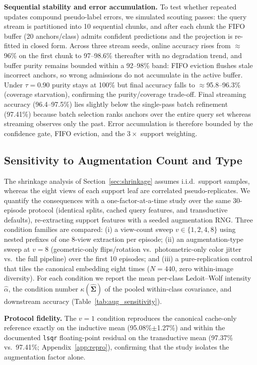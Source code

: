 \documentclass[preprint,12pt]{elsarticle}
\begin{document}
\textbf{Sequential stability and error accumulation.} To test whether repeated updates compound pseudo-label errors, we simulated scouting passes: the query stream is partitioned into 10 sequential chunks, and after each chunk the FIFO buffer (20 anchors/class) admits confident predictions and the projection is re-fitted in closed form. Across three stream seeds, online accuracy rises from $\approx$96\% on the first chunk to 97--98.6\% thereafter with no degradation trend, and buffer purity remains bounded within a 92--98\% band: FIFO eviction flushes stale incorrect anchors, so wrong admissions do not accumulate in the active buffer. Under $\tau = 0.90$ purity stays at 100\% but final accuracy falls to $\approx$95.8--96.3\% (coverage starvation), confirming the purity/coverage trade-off. Final streaming accuracy (96.4--97.5\%) lies slightly below the single-pass batch refinement (97.41\%) because batch selection ranks anchors over the entire query set whereas streaming observes only the past. Error accumulation is therefore bounded by the confidence gate, FIFO eviction, and the $3\times$ support weighting.

\subsection{Sensitivity to Augmentation Count and Type}
\label{sec:aug_sensitivity}
The shrinkage analysis of Section~\ref{sec:shrinkage} assumes i.i.d.\ support samples, whereas the eight views of each support leaf are correlated pseudo-replicates. We quantify the consequences with a one-factor-at-a-time study over the same 30-episode protocol (identical splits, cached query features, and transductive defaults), re-extracting support features with a seeded augmentation RNG. Three condition families are compared: (i) a view-count sweep $v\in\{1,2,4,8\}$ using nested prefixes of one 8-view extraction per episode; (ii) an augmentation-type sweep at $v=8$ (geometric-only flips/rotation vs.\ photometric-only color jitter vs.\ the full pipeline) over the first 10 episodes; and (iii) a pure-replication control that tiles the canonical embedding eight times ($N=440$, zero within-image diversity). For each condition we report the mean per-class Ledoit--Wolf intensity $\hat{\alpha}$, the condition number $\kappa(\hat{\mathbf{\Sigma}})$ of the pooled within-class covariance, and downstream accuracy (Table~\ref{tab:aug_sensitivity}).

\textbf{Protocol fidelity.} The $v=1$ condition reproduces the canonical cache-only reference exactly on the inductive mean (95.08\%$\pm$1.27\%) and within the documented \texttt{lsqr} floating-point residual on the transductive mean (97.37\% vs.\ 97.41\%; Appendix~\ref{app:repro}), confirming that the study isolates the augmentation factor alone.
\end{document}
